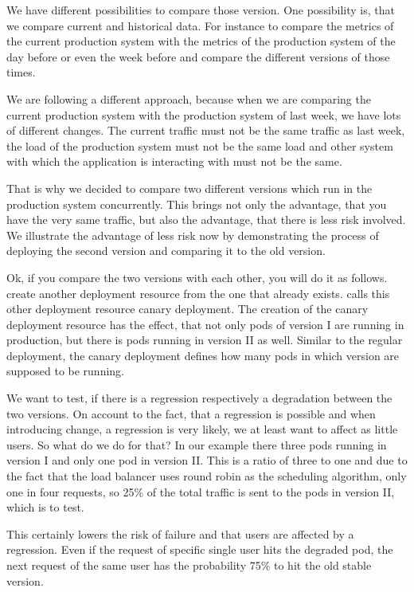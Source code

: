 We have different possibilities to compare those version. One possibility is, that we
compare current and historical data. For instance to compare the metrics of the current
production system with the metrics of the production system of the day before or even the
week before and compare the different versions of those times.

We are following a different approach, because when we are comparing the current
production system with the production system of last week, we have lots of different
changes. The current traffic must not be the same traffic as last week, the load of the
production system must not be the same load and other system with which the application is
interacting with must not be the same.

That is why we decided to compare two different versions which run in the production
system concurrently. This brings not only the advantage, that you have the very same
traffic, but also the advantage, that there is less risk involved. We illustrate the
advantage of less risk now by demonstrating the process of deploying the second version
and comparing it to the old version.

Ok, if you compare the two versions with each other, you will do it as follows. \deployer
create another deployment resource from the one that already exists. \deployer calls this
other deployment resource canary deployment. The creation of the canary deployment
resource has the effect, that not only pods of version I are running in production, but
there is pods running in version II as well. Similar to the regular deployment, the canary
deployment defines how many pods in which version are supposed to be running.

We want to test, if there is a regression respectively a degradation between the two
versions. On account to the fact, that a regression is possible and when introducing
change, a regression is very likely, we at least want to affect as little users. So what
do we do for that? In our example there three pods running in version I and only one pod
in version II. This is a ratio of three to one and due to the fact that the load balancer
uses round robin as the scheduling algorithm, only one in four requests, so 25\% of the
total traffic is sent to the pods in version II, which is to test.

This certainly lowers the risk of failure and that users are affected by a
regression. Even if the request of specific single user hits the degraded pod, the next
request of the same user has the probability 75\% to hit the old stable version.

